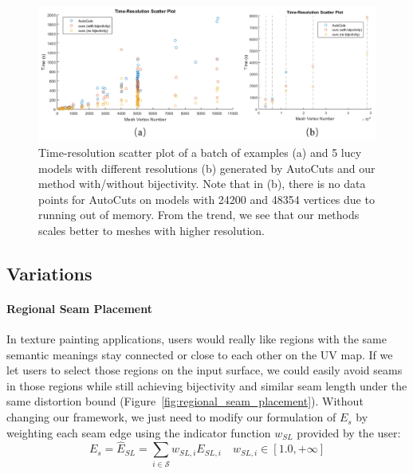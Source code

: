 \begin{figure}[!h]
\centering
\includegraphics[width=\linewidth]{fig/time_res_compAutoCuts.png}
\caption{Time-resolution scatter plot of a batch of examples (a) and 5 lucy models with different resolutions (b) generated by AutoCuts and our method with/without bijectivity. Note that in (b), there is no data points for AutoCuts on models with 24200 and 48354 vertices due to running out of memory. From the trend, we see that our methods scales better to meshes with higher resolution.}
\label{fig:time_res_compAutoCuts}
\end{figure}


\subsection{Variations}

\paragraph{Regional Seam Placement}
In texture painting applications, users would really like regions with the same semantic meanings stay connected or close to each other on the UV map. If we let users to select those regions on the input surface, we could easily avoid seams in those regions while still achieving bijectivity and similar seam length under the same distortion bound (Figure~\ref{fig:regional_seam_placement}). Without changing our framework, we just need to modify our formulation of $E_s$ by weighting each seam edge using the indicator function $w_{SL}$ provided by the user:
\[ E_s = \hat{E}_{SL} = \sum_{i\in\mathcal{S}} w_{SL,i} E_{SL,i} \quad w_{SL,i} \in [1.0, +\infty] \]


